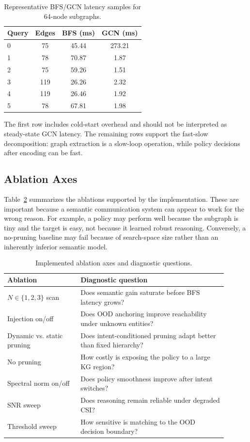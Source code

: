 \documentclass[journal]{IEEEtran}
\begin{document}
\begin{table}[!t]
\centering
\caption{Representative BFS/GCN latency samples for 64-node subgraphs.}
\label{tab:bfs_gcn}
\begin{tabular}{lccc}
\toprule
Query & Edges & BFS (ms) & GCN (ms)\\
\midrule
0 & 75 & 45.44 & 273.21\\
1 & 78 & 70.87 & 1.87\\
2 & 75 & 59.26 & 1.51\\
3 & 119 & 26.26 & 2.32\\
4 & 119 & 26.46 & 1.92\\
5 & 78 & 67.81 & 1.98\\
\bottomrule
\end{tabular}
\end{table}

The first row includes cold-start overhead and should not be interpreted as steady-state GCN latency. The remaining rows support the fast-slow decomposition: graph extraction is a slow-loop operation, while policy decisions after encoding can be fast.

\subsection{Ablation Axes}

Table~\ref{tab:ablations} summarizes the ablations supported by the implementation. These are important because a semantic communication system can appear to work for the wrong reason. For example, a policy may perform well because the subgraph is tiny and the target is easy, not because it learned robust reasoning. Conversely, a no-pruning baseline may fail because of search-space size rather than an inherently inferior semantic model.

\begin{table}[!t]
\centering
\caption{Implemented ablation axes and diagnostic questions.}
\label{tab:ablations}
\footnotesize
\begin{tabular}{p{0.30\linewidth}p{0.60\linewidth}}
\toprule
Ablation & Diagnostic question\\
\midrule
$N\in\{1,2,3\}$ scan & Does semantic gain saturate before BFS latency grows?\\
Injection on/off & Does OOD anchoring improve reachability under unknown entities?\\
Dynamic vs. static pruning & Does intent-conditioned pruning adapt better than fixed hierarchy?\\
No pruning & How costly is exposing the policy to a large KG region?\\
Spectral norm on/off & Does policy smoothness improve after intent switches?\\
SNR sweep & Does reasoning remain reliable under degraded CSI?\\
Threshold sweep & How sensitive is matching to the OOD decision boundary?\\
\bottomrule
\end{tabular}
\end{table}
\end{document}
